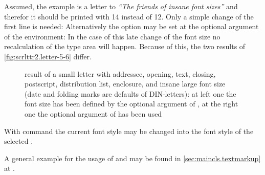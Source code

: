 \begin{Example}
  Assumed, the example is a letter to \emph{``The friends of insane font
    sizes''} and therefor it should be printed with 14 instead of
  12. Only a simple change of the first line is needed:%
  Alternatively the option may be set at the optional argument of the
   environment:%
  In the case of this late change of the font size no recalculation of the
  type area will happen. Because of this, the two results of
  \autoref{fig:scrlttr2.letter-5-6} differ.
  \begin{figure}
    \centering
    \quad
    \caption[{Example: letter with addressee, opening, text,
        closing, postscript, distribution list, enclosure, and insane large
        font size}]{%
        result of a small letter with addressee, opening, text, closing,
        postscript, distribution list, enclosure, and insane large font size
        (date and folding marks are defaults of DIN-letters): at left one the
        font size has been defined by the optional argument of
        , at the right one the optional argument of
         has been used}
    \label{fig:scrlttr2.letter-5-6}
  \end{figure}
\end{Example}
%
%
%



With command  the current font style may be changed into
the font style of the selected .

A general example for the usage of  and 
may be found in \autoref{sec:maincls.textmarkup} at
.

